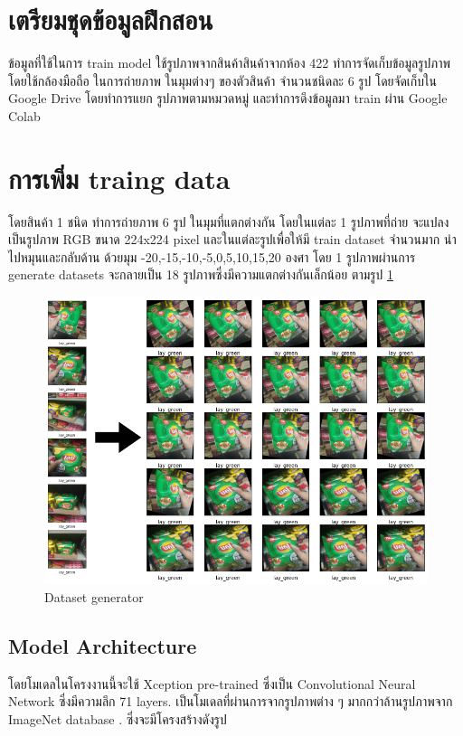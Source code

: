 

\section{เตรียมชุดข้อมูลฝึกสอน}
ข้อมูลที่ใช้ในการ train model ใช้รูปภาพจากสินค้าสินค้าจากห้อง 422  ทำการจัดเก็บข้อมูลรูปภาพ โดยใช้กล้องมือถือ ในการถ่ายภาพ ในมุมต่างๆ
ของตัวสินค้า จำนวนชนิดละ 6 รูป โดยจัดเก็บใน Google Drive โดยทำการแยก รูปภาพตามหมวดหมู่ และทำการดึงข้อมูลมา train ผ่าน Google Colab
 

\section{การเพิ่ม traing data}
โดยสินค้า 1 ชนิด ทำการถ่ายภาพ 6 รูป ในมุมที่แตกต่างกัน 
โดยในแต่ละ 1 รูปภาพที่ถ่าย จะแปลงเป็นรูปภาพ RGB ขนาด 224x224 pixel
และในแต่ละรูปเพื่อให้มี train dataset จำนวนมาก นำไปหมุนและกลับด้าน ด้วยมุม -20,-15,-10,-5,0,5,10,15,20 องศา
โดย 1 รูปภาพผ่านการ generate datasets จะกลายเป็น 18 รูปภาพซึ่งมีความแตกต่างกันเล็กน้อย ตามรูป \ref{fig:Dataset generator}
\begin{figure}[h]
  \begin{center}
   
  \includegraphics[scale=0.4]{pic/lay_genmore.png}
  \end{center}
  
  \caption[Dataset generator]{Dataset generator}
  \label{fig:Dataset generator}
  \end{figure}

  \newpage
\subsection{Model Architecture}
โดยโมเดลในโครงงานนี้จะใช้ Xception pre-trained ซึ่งเป็น Convolutional Neural Network ซึ่งมีความลึก 71 layers.
เป็นโมเดลที่ผ่านการจากรูปภาพต่าง ๆ มากกว่าล้านรูปภาพจาก ImageNet database .
ซึ่งจะมีโครงสร้างดังรูป



